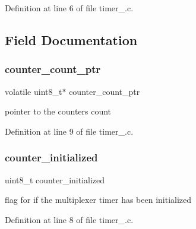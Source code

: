 Definition at line 6 of file timer\+\_.\+c.



\subsection{Field Documentation}
\hypertarget{structtimer__status__t_acbaa3c3476c9e234f13ae0051816699f}{}\label{structtimer__status__t_acbaa3c3476c9e234f13ae0051816699f} 
\subsubsection{\texorpdfstring{counter\+\_\+count\+\_\+ptr}{counter\_count\_ptr}}
{\footnotesize\ttfamily volatile uint8\+\_\+t$\ast$ counter\+\_\+count\+\_\+ptr}



pointer to the counter\textquotesingle{}s count 



Definition at line 9 of file timer\+\_.\+c.

\hypertarget{structtimer__status__t_a73002fe8045c77d68c87dbb60289df08}{}\label{structtimer__status__t_a73002fe8045c77d68c87dbb60289df08} 
\subsubsection{\texorpdfstring{counter\+\_\+initialized}{counter\_initialized}}
{\footnotesize\ttfamily uint8\+\_\+t counter\+\_\+initialized}



flag for if the multiplexer timer has been initialized 



Definition at line 8 of file timer\+\_.\+c.

\hypertarget{structtimer__status__t_af90d90b046e42ab75ab431f74b46b216}{}\label{structtimer__status__t_af90d90b046e42ab75ab431f74b46b216} 
